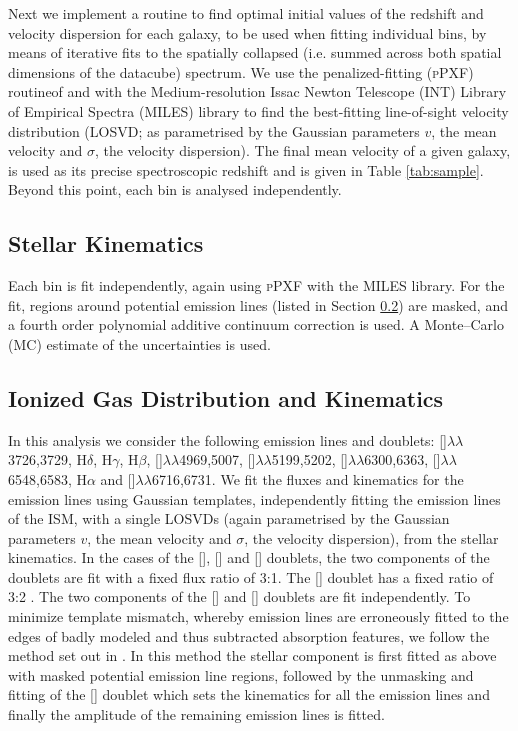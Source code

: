 \documentclass[a4paper,fleqn,usenatbib]{mnras}
\begin{document}
	Next we implement a routine to find optimal initial values of the redshift and velocity dispersion for each galaxy, to be used when fitting individual bins, by means of iterative fits to the spatially collapsed (i.e. summed across both spatial dimensions of the datacube) spectrum. We use the penalized-fitting (\textsc{pPXF}) routine\footnotemark[\ref{fn:Cappellari}] of \citet{Cappellari2004} and \citet{Cappellari2016a} with the Medium-resolution Issac Newton Telescope (INT) Library of Empirical Spectra (MILES) library \citep{Sanchez-Blazquez2006, Falcon-Barroso2011a} to find the best-fitting line-of-sight velocity distribution (LOSVD; as parametrised by the Gaussian parameters $v$, the mean velocity and $\sigma$, the velocity dispersion). The final mean velocity of a given galaxy, is used as its precise spectroscopic redshift and is given in Table \ref{tab:sample}. Beyond this point, each bin is analysed independently.

	\subsection{Stellar Kinematics}
		\label{subsec:starKin}
		Each bin is fit independently, again using \textsc{pPXF} with the MILES library. For the fit, regions around potential emission lines (listed in Section \ref{subsec:EmissionLines}) are masked, and a fourth order polynomial additive continuum correction is used. A Monte--Carlo (MC) estimate of the uncertainties is used. 

	\subsection{Ionized Gas Distribution and Kinematics}
		\label{subsec:EmissionLines}
		In this analysis we consider the following emission lines and doublets: []$\lambda\lambda$3726,3729, H$\delta$, H$\gamma$, H$\beta$, []$\lambda\lambda$4969,5007, []$\lambda\lambda$5199,5202, []$\lambda\lambda$6300,6363, []$\lambda\lambda$6548,6583, H$\alpha$ and []$\lambda\lambda$6716,6731. We fit the fluxes and kinematics for the emission lines using Gaussian templates, independently fitting the emission lines of the ISM, with a single LOSVDs (again parametrised by the Gaussian parameters $v$, the mean velocity and $\sigma$, the velocity dispersion), from the stellar kinematics. In the cases of the [], [] and [] doublets, the two components of the doublets are fit with a fixed flux ratio of 3:1. The [] doublet has a fixed ratio of 3:2 \citep{Safier1992}. The two components of the [] and [] doublets are fit independently. To minimize template mismatch, whereby emission lines are erroneously fitted to the edges of badly modeled and thus subtracted absorption features, we follow the method set out in \citet{Sarzi2005}. In this method the stellar component is first fitted as above with masked potential emission line regions, followed by the unmasking and fitting of the [] doublet which sets the kinematics for all the emission lines and finally the amplitude of the remaining emission lines is fitted.
\end{document}
